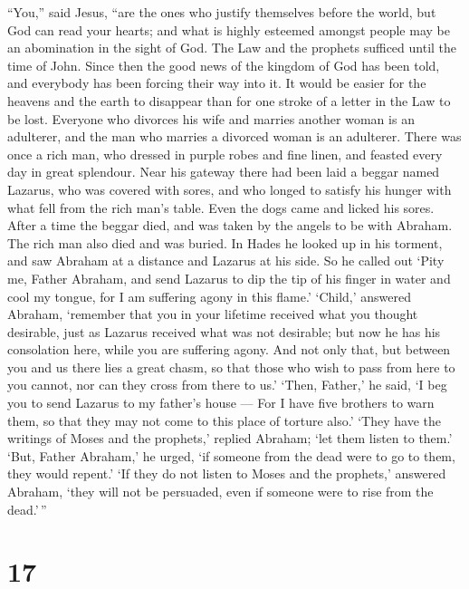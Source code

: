  ``You,'' said Jesus, ``are the ones who justify themselves
before the world, but God can read your hearts; and what is highly
esteemed amongst people may be an abomination in the sight of God.
 The Law and the prophets sufficed until the time of John.
Since then the good news of the kingdom of God has been told, and
everybody has been forcing their way into it.  It would be
easier for the heavens and the earth to disappear than for one stroke of
a letter in the Law to be lost.  Everyone who divorces his
wife and marries another woman is an adulterer, and the man who marries
a divorced woman is an adulterer.  There was once a rich
man, who dressed in purple robes and fine linen, and feasted every day
in great splendour.  Near his gateway there had been laid a
beggar named Lazarus, who was covered with sores,  and who
longed to satisfy his hunger with what fell from the rich man's table.
Even the dogs came and licked his sores.  After a time the
beggar died, and was taken by the angels to be with Abraham. The rich
man also died and was buried.  In Hades he looked up in his
torment, and saw Abraham at a distance and Lazarus at his side.
 So he called out `Pity me, Father Abraham, and send
Lazarus to dip the tip of his finger in water and cool my tongue, for I
am suffering agony in this flame.'  `Child,' answered
Abraham, `remember that you in your lifetime received what you thought
desirable, just as Lazarus received what was not desirable; but now he
has his consolation here, while you are suffering agony. 
And not only that, but between you and us there lies a great chasm, so
that those who wish to pass from here to you cannot, nor can they cross
from there to us.'  `Then, Father,' he said, `I beg you to
send Lazarus to my father's house ---  For I have five
brothers to warn them, so that they may not come to this place of
torture also.'  `They have the writings of Moses and the
prophets,' replied Abraham; `let them listen to them.' 
`But, Father Abraham,' he urged, `if someone from the dead were to go to
them, they would repent.'  `If they do not listen to Moses
and the prophets,' answered Abraham, `they will not be persuaded, even
if someone were to rise from the dead.'\,''

\hypertarget{section-15}{%
\section{17}\label{section-15}}

